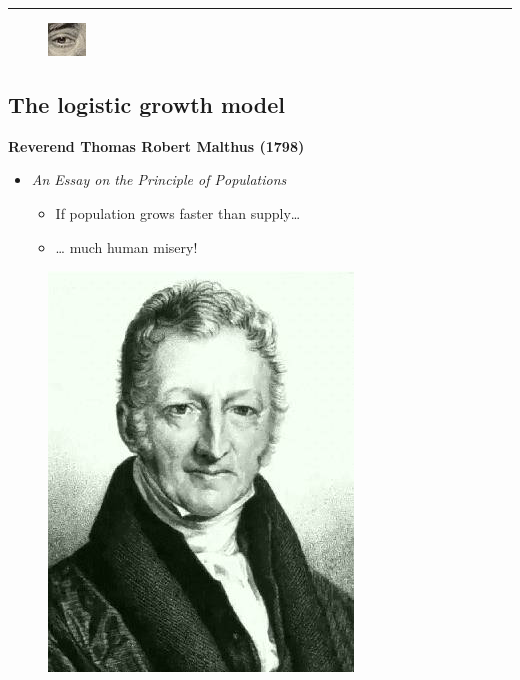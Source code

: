 \documentclass[
  letterpaper,
  DIV=11,
  numbers=noendperiod]{scrartcl}
\providecommand{\tightlist}{%
  \setlength{\itemsep}{0pt}\setlength{\parskip}{0pt}}\usepackage{longtable,booktabs,array}
\begin{document}
\begin{center}\rule{0.5\linewidth}{0.5pt}\end{center}

\begin{figure}

{\centering \includegraphics{images/closest_will.png}

}

\end{figure}

\hypertarget{the-logistic-growth-model-2}{%
\subsection{The logistic growth
model}\label{the-logistic-growth-model-2}}

\textbf{Reverend Thomas Robert Malthus (1798)}

\begin{itemize}
\item
  \emph{An Essay on the Principle of Populations}

  \begin{itemize}
  \tightlist
  \item
    If population grows faster than supply\ldots{}
  \item
    \ldots{} much human misery!
  \end{itemize}
\end{itemize}

\begin{figure}

\hfill{} \includegraphics{images/TomasMaltus.png}

\end{figure}
\end{document}
